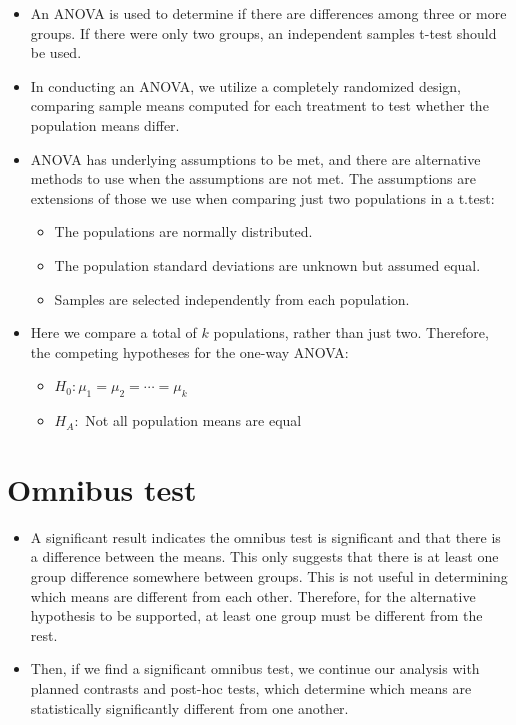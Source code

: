 \documentclass[
  letterpaper,
  DIV=11,
  numbers=noendperiod]{scrreprt}
\providecommand{\tightlist}{%
  \setlength{\itemsep}{0pt}\setlength{\parskip}{0pt}}\usepackage{longtable,booktabs,array}
\begin{document}
\begin{itemize}
\tightlist
\item
  An ANOVA is used to determine if there are differences among three or
  more groups. If there were only two groups, an independent samples
  t-test should be used.
\item
  In conducting an ANOVA, we utilize a completely randomized design,
  comparing sample means computed for each treatment to test whether the
  population means differ.
\item
  ANOVA has underlying assumptions to be met, and there are alternative
  methods to use when the assumptions are not met. The assumptions are
  extensions of those we use when comparing just two populations in a
  t.test:

  \begin{itemize}
  \tightlist
  \item
    The populations are normally distributed.
  \item
    The population standard deviations are unknown but assumed equal.
  \item
    Samples are selected independently from each population.
  \end{itemize}
\item
  Here we compare a total of \(k\) populations, rather than just two.
  Therefore, the competing hypotheses for the one-way ANOVA:

  \begin{itemize}
  \tightlist
  \item
    \(H_0: \mu_1 = \mu_2 = \cdots= \mu_k\)
  \item
    \(H_A:\) Not all population means are equal
  \end{itemize}
\end{itemize}

\section{Omnibus test}\label{omnibus-test}

\begin{itemize}
\tightlist
\item
  A significant result indicates the omnibus test is significant and
  that there is a difference between the means. This only suggests that
  there is at least one group difference somewhere between groups. This
  is not useful in determining which means are different from each
  other. Therefore, for the alternative hypothesis to be supported, at
  least one group must be different from the rest.
\item
  Then, if we find a significant omnibus test, we continue our analysis
  with planned contrasts and post-hoc tests, which determine which means
  are statistically significantly different from one another.
\end{itemize}
\end{document}
